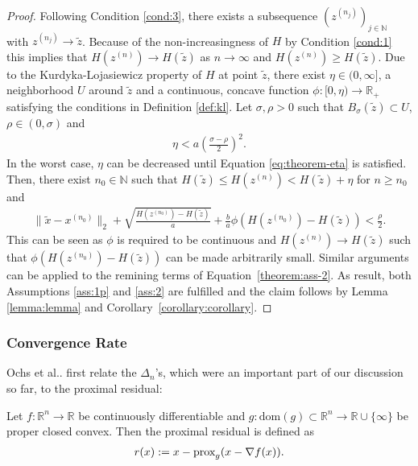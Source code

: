 \documentclass[onecolumn,final,a4paper,13pt,reqno]{siamart}
\makeatletter
\DeclareRobustCommand\onedot{\futurelet\@let@token\@onedot}
\def\@onedot{\ifx\@let@token.\else.\null\fi\xspace}
\def\etal{{et al}\onedot}
\DeclareRobustCommand{\prox}[1]{%
    \ifmmode
        \text{prox}_{#1}
    \else
        $\text{prox}_{#1}$
    \fi
}
\def\dom{\text{dom}}
\makeatother
\begin{document}
\begin{proof}
	Following Condition \ref{cond:3}, there exists a subsequence $(z^{(n_j)})_{j \in \mathbb{N}}$ with $z^{(n_j)} \rightarrow \tilde{z}$. Because of the non-increasingness of $H$ by Condition \ref{cond:1} this implies that $H(z^{(n)}) \rightarrow H(\tilde{z})$ as $n \rightarrow \infty$ and $H(z^{(n)}) \geq H(\tilde{z})$. Due to the Kurdyka-Lojasiewicz property of $H$ at point $\tilde{z}$, there exist $\eta \in (0, \infty]$, a neighborhood $U$ around $\tilde{z}$ and a continuous, concave function $\phi: [0, \eta) \rightarrow \mathbb{R}_+$ satisfying the conditions in Definition \ref{def:kl}. Let $\sigma, \rho > 0$ such that $B_\sigma(\tilde{z}) \subset U$, $\rho \in (0, \sigma)$ and
	\begin{align}
		\eta < a \left(\frac{\sigma - \rho}{2}\right)^2.\label{eq:theorem-eta}
	\end{align}
	In the worst case, $\eta$ can be decreased until Equation \eqref{eq:theorem-eta} is satisfied. Then, there exist $n_0 \in \mathbb{N}$ such that $H(\tilde{z}) \leq H(z^{(n)}) < H(\tilde{z}) + \eta$ for $n \geq n_0$ and
	 \begin{align}
	 	\|\tilde{x} - x^{(n_0)}\|_2 + \sqrt{\frac{H(z^{(n_0)}) - H(\tilde{z})}{a}} + \frac{b}{a} \phi(H(z^{(n_0)}) - H(\tilde{z})) < \frac{\rho}{2}.\label{theorem:ass-2}
	 \end{align}
	 This can be seen as $\phi$ is required to be continuous and $H(z^{(n)}) \rightarrow H(\tilde{z})$ such that $\phi(H(z^{(n_0)}) - H(\tilde{z}))$ can be made arbitrarily small. Similar arguments can be applied to the remining terms of Equation~\eqref{theorem:ass-2}. As result, both Assumptions \ref{ass:1p} and \ref{ass:2} are fulfilled and the claim follows by Lemma \ref{lemma:lemma} and Corollary~\ref{corollary:corollary}.
\end{proof}

\subsubsection{Convergence Rate}
\label{subsec:ipiano-rate}

Ochs \etal first relate the $\Delta_n$'s, which were an important part of our discussion so far, to the proximal residual:

\begin{definitionmd}
	Let $f : \mathbb{R}^n \rightarrow \mathbb{R}$ be continuously differentiable and $g : \dom(g) \subset \mathbb{R}^n \rightarrow \mathbb{R} \cup \{\infty\}$ be proper closed convex. Then the proximal residual is defined as
	\begin{align}
		r(x) := x - \prox{g}(x - \nabla f(x)).
	\end{align}\label{def:residual}
\end{definitionmd}
\end{document}
